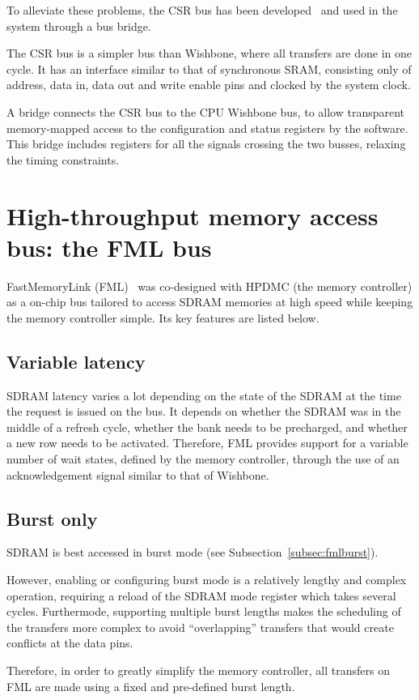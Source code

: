 \documentclass[a4paper,11pt]{kthesis}
\begin{document}
To alleviate these problems, the CSR bus has been developed~\cite{csr} and used in the system through a bus bridge.

The CSR bus is a simpler bus than Wishbone, where all transfers are done in one cycle. It has an interface similar to that of synchronous SRAM, consisting only of address, data in, data out and write enable pins and clocked by the system clock.

A bridge connects the CSR bus to the CPU Wishbone bus, to allow transparent memory-mapped access to the configuration and status registers by the software. This bridge includes registers for all the signals crossing the two busses, relaxing the timing constraints.

\section{High-throughput memory access bus: the FML bus}
FastMemoryLink (FML)~\cite{fml} was co-designed with HPDMC (the memory controller) as a on-chip bus tailored to access SDRAM memories at high speed while keeping the memory controller simple. Its key features are listed below.

\subsection{Variable latency}
SDRAM latency varies a lot depending on the state of the SDRAM at the time the request is issued on the bus. It depends on whether the SDRAM was in the middle of a refresh cycle, whether the bank needs to be precharged, and whether a new row needs to be activated. Therefore, FML provides support for a variable number of wait states, defined by the memory controller, through the use of an acknowledgement signal similar to that of Wishbone.

\subsection{Burst only}
SDRAM is best accessed in burst mode (see Subsection~\ref{subsec:fmlburst}).

However, enabling or configuring burst mode is a relatively lengthy and complex operation, requiring a reload of the SDRAM mode register which takes several cycles. Furthermode, supporting multiple burst lengths makes the scheduling of the transfers more complex to avoid ``overlapping'' transfers that would create conflicts at the data pins.

Therefore, in order to greatly simplify the memory controller, all transfers on FML are made using a fixed and pre-defined burst length.
\end{document}
